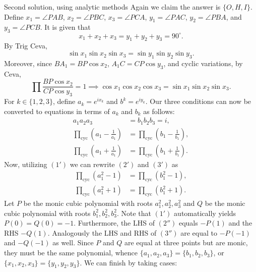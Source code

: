 \begin{customenv}{Second solution, using analytic methods}
    Again we claim the answer is $\{O,H,I\}$. Define $x_1=\angle PAB$, $x_2=\angle PBC$, $x_3=\angle PCA$, $y_1=\angle PAC$, $y_2=\angle PBA$, and $y_3=\angle PCB$. It is given that
    \setcounter{equation}{0}
    \begin{equation}
        x_1+x_2+x_3=y_1+y_2+y_3=90^\circ.
    \end{equation}
    By Trig Ceva,
    \begin{equation}
        \sin x_1\sin x_2\sin x_3=\sin y_1\sin y_2\sin y_3.
    \end{equation}
    Moreover, since $BA_1=BP\cos x_2$, $A_1C=CP\cos y_3$, and cyclic variations, by Ceva,
    \begin{equation}
        \prod\frac{BP\cos x_2}{CP\cos y_3}=1\implies \cos x_1\cos x_2\cos x_3=\sin x_1\sin x_2\sin x_3.
    \end{equation}
    For $k\in\{1,2,3\}$, define $a_k=e^{ix_k}$ and $b^k=e^{iy_k}$. Our three conditions can now be converted to equations in terms of $a_k$ and $b_k$ as follows:
    \begin{align}
        \tag{1'}a_1a_2a_3&=b_1b_2b_3=i,\\
        \tag{2'}\prod_\mathrm{cyc}\left(a_1-\frac1{a_1}\right)&=\prod_\mathrm{cyc}\left(b_1-\frac1{b_1}\right),\\
        \tag{3'}\prod_\mathrm{cyc}\left(a_1+\frac1{a_1}\right)&=\prod_\mathrm{cyc}\left(b_1+\frac1{b_1}\right).
    \end{align}
    Now, utilizing $(1')$ we can rewrite $(2')$ and $(3')$ as
    \begin{align}
        \tag{2''}\prod_\mathrm{cyc}\left(a_1^2-1\right)&=\prod_\mathrm{cyc}\left(b_1^2-1\right),\\
        \tag{3''}\prod_\mathrm{cyc}\left(a_1^2+1\right)&=\prod_\mathrm{cyc}\left(b_1^2+1\right).
    \end{align}
    Let $P$ be the monic cubic polynomial with roots $a_1^2,a_2^2,a_3^2$ and $Q$ be the monic cubic polynomial with roots $b_1^2,b_2^2,b_3^2$. Note that $(1')$ automatically yields $P(0)=Q(0)=-1$. Furthermore, the LHS of $(2'')$ equals $-P(1)$ and the RHS $-Q(1)$. Analogously the LHS and RHS of $(3'')$ are equal to $-P(-1)$ and $-Q(-1)$ as well. Since $P$ and $Q$ are equal at three points but are monic, they must be the same polynomial, whence $\{a_1,a_2,a_3\}=\{b_1,b_2,b_3\}$, or $\{x_1,x_2,x_3\}=\{y_1,y_2,y_3\}$. We can finish by taking cases:
    \begin{itemize}

\end{itemize}
\end{customenv}
